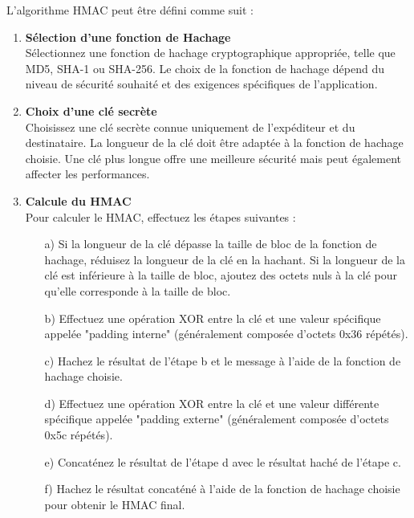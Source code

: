 L'algorithme HMAC peut être défini comme suit :\\
\begin{enumerate}
    \item \textbf{Sélection d’une fonction de Hachage}\\Sélectionnez une fonction de hachage cryptographique appropriée, telle que MD5, SHA-1 ou SHA-256. Le choix de la fonction de hachage dépend du niveau de sécurité souhaité et des exigences spécifiques de l'application.\\
    \item \textbf{Choix d’une clé secrète}\\Choisissez une clé secrète connue uniquement de l'expéditeur et du destinataire. La longueur de la clé doit être adaptée à la fonction de hachage choisie. Une clé plus longue offre une meilleure sécurité mais peut également affecter les performances.\\
    \item \textbf{Calcule du HMAC}\\Pour calculer le HMAC, effectuez les étapes suivantes :\\ 
    \begin{itemize}
        \item [a)] Si la longueur de la clé dépasse la taille de bloc de la fonction de hachage, réduisez la longueur de la clé en la hachant. Si la longueur de la clé est inférieure à la taille de bloc, ajoutez des octets nuls à la clé pour qu'elle corresponde à la taille de bloc.\\
        \item [b)] Effectuez une opération XOR entre la clé et une valeur spécifique appelée "padding interne" (généralement composée d'octets 0x36 répétés).\\
        \item [c)] Hachez le résultat de l'étape b et le message à l'aide de la fonction de hachage choisie.\\
        \item [d)] Effectuez une opération XOR entre la clé et une valeur différente spécifique appelée "padding externe" (généralement composée d'octets 0x5c répétés).\\
        \item [e)] Concaténez le résultat de l'étape d avec le résultat haché de l'étape c.\\
        \item [f)] Hachez le résultat concaténé à l'aide de la fonction de hachage choisie pour obtenir le HMAC final.\\
    \end{itemize}
\end{enumerate}

